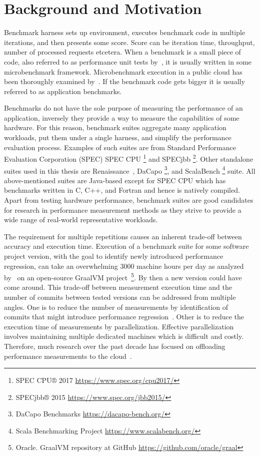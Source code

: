 \chapter{Background and Motivation}
\label{chap:background}

Benchmark harness sets up environment, executes benchmark code in multiple iterations, and then presents some score.
Score can be iteration time, throughput, number of processed requests etcetera.
When a benchmark is a small piece of code, also referred to as performance unit tests by~\citet{horky2015unit}, it is usually written in some microbenchmark framework.
Microbenchmark execution in a public cloud has been thoroughly examined by~\citet{laaber2019software}.
If the benchmark code gets bigger it is usually referred to as application benchmarks.

Benchmarks do not have the sole purpose of measuring the performance of an application, inversely they provide a way to measure the capabilities of some hardware.
For this reason, benchmark suites aggregate many application workloads, put them under a single harness, and simplify the performance evaluation process.
Examples of such suites are from Standard Performance Evaluation Corporation (SPEC) SPEC CPU \footnote{SPEC CPU® 2017 \url{https://www.spec.org/cpu2017/}} and SPECjbb \footnote{SPECjbb® 2015 \url{https://www.spec.org/jbb2015/}}.
Other standalone suites used in this thesis are Renaissance~\cite{prokopec2019renaissance}, DaCapo \footnote{DaCapo Benchmarks \url{https://dacapo-bench.org/}}, and ScalaBench \footnote{Scala Benchmarking Project \url{https://www.scalabench.org/}} suite.
All above-mentioned suites are Java-based except for SPEC CPU which has benchmarks written in C, C++, and Fortran and hence is natively compiled.
Apart from testing hardware performance, benchmark suites are good candidates for research in performance measurement methods as they strive to provide a wide range of real-world representative workloads.

The requirement for multiple repetitions causes an inherent trade-off between accuracy and execution time.
Execution of a benchmark suite for some software project version, with the goal to identify newly introduced performance regression, can take an overwhelming 3000 machine hours per day as analyzed by~\citet{bulej2020duet} on an open-source GraalVM project~\footnote{Oracle. GraalVM repository at GitHub \url{https://github.com/oracle/graal}}.
By then a new version could have come around.
This trade-off between measurement execution time and the number of commits between tested versions can be addressed from multiple angles.
One is to reduce the number of measurements by identification of commits that might introduce performance regression~\citet{oliveira2017perphecy}.
Other is to reduce the execution time of measurements by parallelization.
Effective parallelization involves maintaining multiple dedicated machines which is difficult and costly.
Therefore, much research over the past decade has focused on offloading performance measurements to the cloud~\cite{leitner2016patterns, laaber2019software, abedi2017conducting}.

